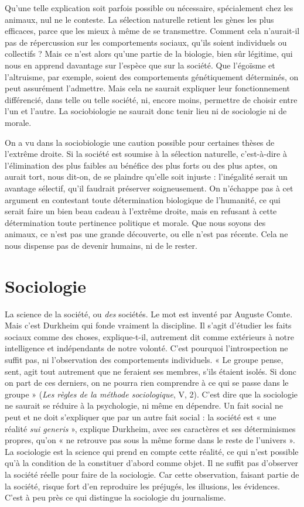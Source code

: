 Qu’une telle explication soit parfois possible ou nécessaire, spécialement
chez les animaux, nul ne le conteste. La sélection naturelle retient les gènes les
plus efficaces, parce que les mieux à même de se transmettre. Comment cela
n'aurait-il pas de répercussion sur les comportements sociaux, qu’ils soient
individuels ou collectifs ? Mais ce n’est alors qu'une partie de la biologie, bien
sûr légitime, qui nous en apprend davantage sur l’espèce que sur la société. Que
l’égoïsme et l’altruisme, par exemple, soient des comportements génétiquement
déterminés, on peut assurément l’admettre. Mais cela ne saurait expliquer leur
fonctionnement différencié, dans telle ou telle société, ni, encore moins, permettre
de choisir entre l’un et l’autre. La sociobiologie ne saurait donc tenir
lieu ni de sociologie ni de morale.

On a vu dans la sociobiologie une caution possible pour certaines thèses de
l'extrême droite. Si la société est soumise à la sélection naturelle, c’est-à-dire à
l'élimination des plus faibles au bénéfice des plus forts ou des plus aptes, on
aurait tort, nous dit-on, de se plaindre qu’elle soit injuste : l'inégalité serait un
avantage sélectif, qu’il faudrait préserver soigneusement. On n'échappe pas à
cet argument en contestant toute détermination biologique de l’humanité, ce
qui serait faire un bien beau cadeau à l'extrême droite, mais en refusant à cette
détermination toute pertinence politique et morale. Que nous soyons des animaux,
ce n'est pas une grande découverte, ou elle n’est pas récente. Cela ne
nous dispense pas de devenir humains, ni de le rester.

\section{Sociologie}
La science de la société, ou {\it des} sociétés. Le mot est inventé
par Auguste Comte. Mais c’est Durkheim qui fonde vraiment
la discipline. Il s’agit d'étudier les faits sociaux comme des choses,
explique-t-il, autrement dit comme extérieurs à notre intelligence et indépendants
de notre volonté. C’est pourquoi l’introspection ne suffit pas, ni l’observation
des comportements individuels. « Le groupe pense, sent, agit tout autrement
 que ne feraient ses membres, s’ils étaient isolés. Si donc on part de ces
derniers, on ne pourra rien comprendre à ce qui se passe dans le groupe » ({\it Les
règles de la méthode sociologique}, V, 2). C’est dire que la sociologie ne saurait se
réduire à la psychologie, ni même en dépendre. Un fait social ne peut et ne doit
s'expliquer que par un autre fait social : la société est « une réalité {\it sui generis} »,
explique Durkheim, avec ses caractères et ses déterminismes propres, qu’on
« ne retrouve pas sous la même forme dans le reste de l’univers ». La sociologie
est la science qui prend en compte cette réalité, ce qui n’est possible qu’à la
condition de la constituer d’abord comme objet. Il ne suffit pas d’observer la
société réelle pour faire de la sociologie. Car cette observation, faisant partie de
la société, risque fort d’en reproduire les préjugés, les illusions, les évidences.
C’est à peu près ce qui distingue la sociologie du journalisme.

